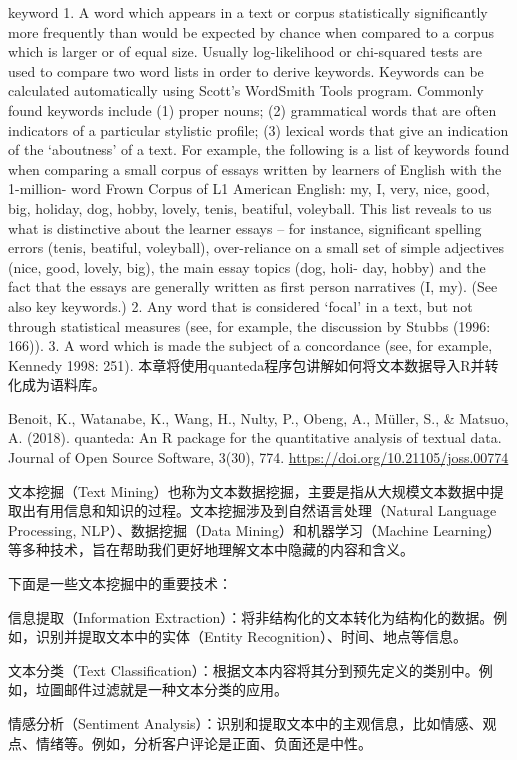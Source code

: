 \documentclass[]{book}
\begin{document}
keyword
1. A word which appears in a text or corpus statistically significantly more frequently than would be expected by chance when compared to a corpus which is larger or of equal size. Usually log-likelihood or chi-squared tests are used to compare two word lists in order to derive keywords. Keywords can be calculated automatically using Scott's WordSmith Tools program. Commonly found keywords include (1) proper nouns; (2) grammatical words that are often indicators of a particular stylistic profile; (3) lexical words that give an indication of the `aboutness' of a text. For example, the following is a list of keywords found when comparing a small corpus of essays written by learners of English with the 1-million- word Frown Corpus of L1 American English: my, I, very, nice, good, big, holiday, dog, hobby, lovely, tenis, beatiful, voleyball. This list reveals to us what is distinctive about the learner essays -- for instance, significant spelling errors (tenis, beatiful, voleyball), over-reliance on a small set of simple adjectives (nice, good, lovely, big), the main essay topics (dog, holi- day, hobby) and the fact that the essays are generally written as first person narratives (I, my). (See also key keywords.)
2. Any word that is considered `focal' in a text, but not through statistical measures (see, for example, the discussion by Stubbs (1996: 166)).
3. A word which is made the subject of a concordance (see, for example, Kennedy 1998: 251).
本章将使用quanteda程序包讲解如何将文本数据导入R并转化成为语料库。

Benoit, K., Watanabe, K., Wang, H., Nulty, P., Obeng, A., Müller, S., \& Matsuo, A. (2018). quanteda: An R package for the quantitative analysis of textual data. Journal of Open Source Software, 3(30), 774. \url{https://doi.org/10.21105/joss.00774}

文本挖掘（Text Mining）也称为文本数据挖掘，主要是指从大规模文本数据中提取出有用信息和知识的过程。文本挖掘涉及到自然语言处理（Natural Language Processing, NLP）、数据挖掘（Data Mining）和机器学习（Machine Learning）等多种技术，旨在帮助我们更好地理解文本中隐藏的内容和含义。

下面是一些文本挖掘中的重要技术：

信息提取（Information Extraction）：将非结构化的文本转化为结构化的数据。例如，识别并提取文本中的实体（Entity Recognition）、时间、地点等信息。

文本分类（Text Classification）：根据文本内容将其分到预先定义的类别中。例如，垃圖邮件过滤就是一种文本分类的应用。

情感分析（Sentiment Analysis）：识别和提取文本中的主观信息，比如情感、观点、情绪等。例如，分析客户评论是正面、负面还是中性。
\end{document}
